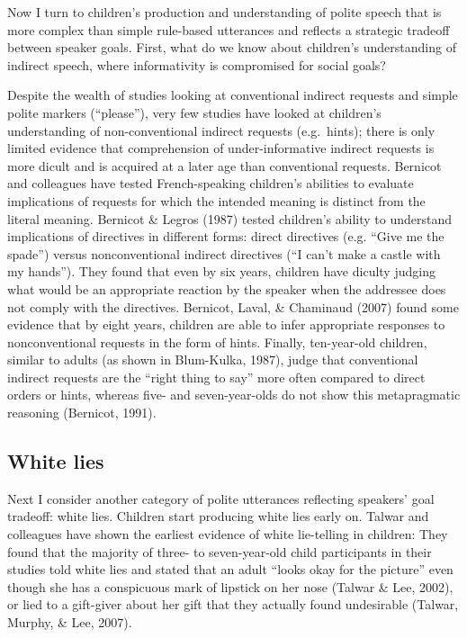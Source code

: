 \documentclass[oneside]{report}
\begin{document}
Now I turn to children's production and understanding of polite speech
that is more complex than simple rule-based utterances and reflects a
strategic tradeoff between speaker goals. First, what do we know about
children's understanding of indirect speech, where informativity is
compromised for social goals?

Despite the wealth of studies looking at conventional indirect requests
and simple polite markers (``please''), very few studies have looked at
children's understanding of non-conventional indirect requests
(e.g.~hints); there is only limited evidence that comprehension of
under-informative indirect requests is more dicult and is acquired at a
later age than conventional requests. Bernicot and colleagues have
tested French-speaking children's abilities to evaluate implications of
requests for which the intended meaning is distinct from the literal
meaning. Bernicot \& Legros (1987) tested children's ability to
understand implications of directives in different forms: direct
directives (e.g. ``Give me the spade'') versus nonconventional indirect
directives (``I can't make a castle with my hands''). They found that
even by six years, children have diculty judging what would be an
appropriate reaction by the speaker when the addressee does not comply
with the directives. Bernicot, Laval, \& Chaminaud (2007) found some
evidence that by eight years, children are able to infer appropriate
responses to nonconventional requests in the form of hints. Finally,
ten-year-old children, similar to adults (as shown in Blum-Kulka, 1987),
judge that conventional indirect requests are the ``right thing to say''
more often compared to direct orders or hints, whereas five- and
seven-year-olds do not show this metapragmatic reasoning (Bernicot,
1991).

\subsection{White lies}\label{white-lies}

Next I consider another category of polite utterances reflecting
speakers' goal tradeoff: white lies. Children start producing white lies
early on. Talwar and colleagues have shown the earliest evidence of
white lie-telling in children: They found that the majority of three- to
seven-year-old child participants in their studies told white lies and
stated that an adult ``looks okay for the picture'' even though she has
a conspicuous mark of lipstick on her nose (Talwar \& Lee, 2002), or
lied to a gift-giver about her gift that they actually found undesirable
(Talwar, Murphy, \& Lee, 2007).
\end{document}
